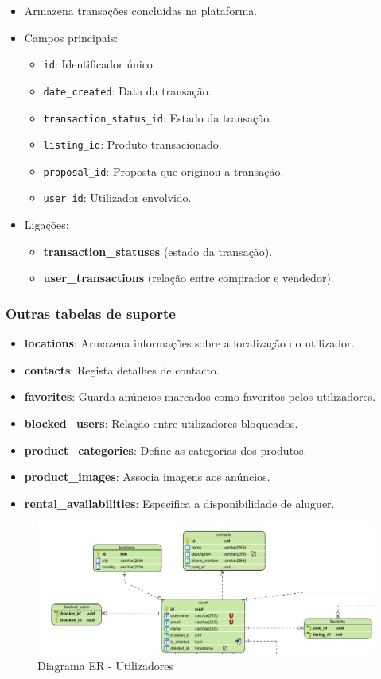 \documentclass[a4paper, 12pt]{article} %
\begin{document}
\begin{itemize}
	\item Armazena transações concluídas na plataforma.
	\item Campos principais:
	\begin{itemize}
		\item \verb|id|: Identificador único.
		\item \verb|date_created|: Data da transação.
		\item \verb|transaction_status_id|: Estado da transação.
		\item \verb|listing_id|: Produto transacionado.
		\item \verb|proposal_id|: Proposta que originou a transação.
		\item \verb|user_id|: Utilizador envolvido.
	\end{itemize}
	\item Ligações:
	\begin{itemize}
		\item \textbf{transaction\_statuses} (estado da transação).
		\item \textbf{user\_transactions} (relação entre comprador e vendedor).
	\end{itemize}
\end{itemize}

\subsubsection{\textbf{Outras tabelas de suporte}}

\begin{itemize}
	\item \textbf{locations}: Armazena informações sobre a localização do utilizador.
	\item \textbf{contacts}: Regista detalhes de contacto.
	\item \textbf{favorites}: Guarda anúncios marcados como favoritos pelos utilizadores.
	\item \textbf{blocked\_users}: Relação entre utilizadores bloqueados.
	\item \textbf{product\_categories}: Define as categorias dos produtos.
	\item \textbf{product\_images}: Associa imagens aos anúncios.
	\item \textbf{rental\_availabilities}: Especifica a disponibilidade de aluguer.
\end{itemize}

\begin{figure}[ht]
	\centering

	\includegraphics[width=\textwidth]{../images/entity-relationship-diagram-users.png}
	\caption{Diagrama ER - Utilizadores}
	\label{fig:ER Users}
\end{figure}
\newpage
\end{document}
